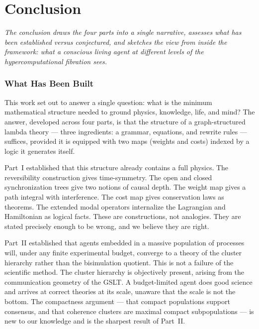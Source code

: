 \documentclass[12pt]{article}
\theoremstyle{remark}
\begin{document}



\newpage
\part*{Conclusion}

\vspace{1em}
\begin{mdframed}[backgroundcolor=remarkgray, linecolor=gray!60,
                 linewidth=1pt, topline=false, rightline=false,
                 bottomline=false]
\small\itshape
The conclusion draws the four parts into a single narrative,
assesses what has been established versus conjectured, and
sketches the view from inside the framework: what a conscious
living agent at different levels of the hypercomputational
fibration sees.
\end{mdframed}
\vspace{1.5em}

\section*{What Has Been Built}

This work set out to answer a single question: what is the minimum
mathematical structure needed to ground physics, knowledge, life,
and mind?
The answer, developed across four parts, is that the structure of a
graph-structured lambda theory --- three ingredients: a grammar,
equations, and rewrite rules --- suffices, provided it is equipped
with two maps (weights and costs) indexed by a logic it generates
itself.

Part~I established that this structure already contains a full
physics.
The reversibility construction gives time-symmetry.
The open and closed synchronization trees give two notions of
causal depth.
The weight map gives a path integral with interference.
The cost map gives conservation laws as theorems.
The extended modal operators internalize the Lagrangian and
Hamiltonian as logical facts.
These are constructions, not analogies.
They are stated precisely enough to be wrong, and we believe they
are right.

Part~II established that agents embedded in a massive population
of processes will, under any finite experimental budget, converge
to a theory of the cluster hierarchy rather than the bisimulation
quotient.
This is not a failure of the scientific method.
The cluster hierarchy is objectively present, arising from the
communication geometry of the GSLT.
A budget-limited agent does good science and arrives at correct
theories at its scale, unaware that the scale is not the bottom.
The compactness argument --- that compact populations support
consensus, and that coherence clusters are maximal compact
subpopulations --- is new to our knowledge and is the sharpest
result of Part~II.
\end{document}
